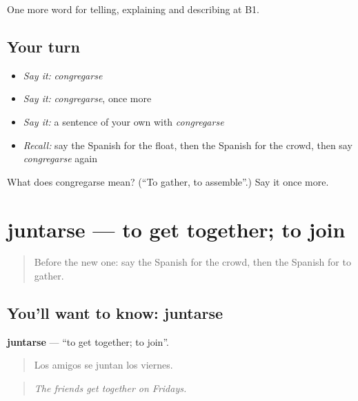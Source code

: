 \begin{grammarlens}[title={What you've built}]
One more word for telling, explaining and describing at B1.
\end{grammarlens}

\subsection*{Your turn}
\begin{itemize}
\raggedright
  \item \emph{Say it:} \emph{congregarse}
  \item \emph{Say it:} \emph{congregarse}, once more
  \item \emph{Say it:} a sentence of your own with \emph{congregarse}
  \item \emph{Recall:} say the Spanish for the float, then the Spanish for the crowd, then say \emph{congregarse} again
\end{itemize}

\begin{tcolorbox}[breakable,colback=teal!4,colframe=teal!35!black,title={Before you move on}]
What does congregarse mean? (\textquotedblleft{}To gather, to assemble\textquotedblright{}.) Say it once more.
\end{tcolorbox}
\section[juntarse]{juntarse — to get together; to join}

\label{lesson:ES-C560-juntarse}



\begin{quote}
Before the new one: say the Spanish for the crowd, then the Spanish for to gather.
\end{quote}

\subsection*{You'll want to know: juntarse}
\textbf{juntarse} — \textquotedblleft{}to get together; to join\textquotedblright{}.

\begin{quote}
Los amigos se juntan los viernes.
\end{quote}

\begin{quote}
\emph{The friends get together on Fridays.}
\end{quote}

